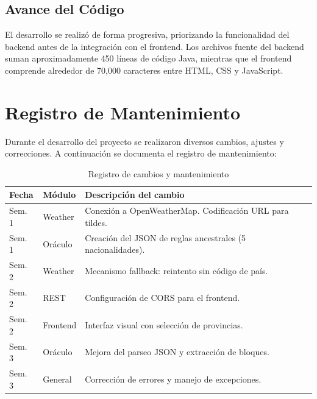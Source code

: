 \documentclass[conference]{IEEEtran}
\begin{document}
\subsection{Avance del Código}

El desarrollo se realizó de forma progresiva, priorizando la funcionalidad del backend antes de la integración con el frontend. Los archivos fuente del backend suman aproximadamente 450 líneas de código Java, mientras que el frontend comprende alrededor de 70,000 caracteres entre HTML, CSS y JavaScript.

\section{Registro de Mantenimiento}

Durante el desarrollo del proyecto se realizaron diversos cambios, ajustes y correcciones. A continuación se documenta el registro de mantenimiento:

\begin{table}[H]
    \centering
    \caption{Registro de cambios y mantenimiento}
    \label{tab:mantenimiento}
    \scriptsize
    \begin{tabularx}{\columnwidth}{|l|l|X|}
        \hline
        \textbf{Fecha} & \textbf{Módulo} & \textbf{Descripción del cambio} \\
        \hline
        Sem. 1 & Weather & Conexión a OpenWeatherMap. Codificación URL para tildes. \\
        \hline
        Sem. 1 & Oráculo & Creación del JSON de reglas ancestrales (5 nacionalidades). \\
        \hline
        Sem. 2 & Weather & Mecanismo fallback: reintento sin código de país. \\
        \hline
        Sem. 2 & REST & Configuración de CORS para el frontend. \\
        \hline
        Sem. 2 & Frontend & Interfaz visual con selección de provincias. \\
        \hline
        Sem. 3 & Oráculo & Mejora del parseo JSON y extracción de bloques. \\
        \hline
        Sem. 3 & General & Corrección de errores y manejo de excepciones. \\
        \hline
    \end{tabularx}
\end{table}
\end{document}
